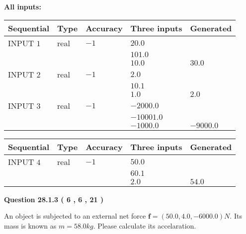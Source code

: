 \documentclass[12pt]{article}
\begin{document}
   
   
   
\noindent\vspace{0.1in}\hspace{-0.08in} {\textbf{\Large{All inputs: }}}
   
   
  
  
\noindent\begin{tabular}{|l|l|l|l|l|}
\hline
 Sequential & Type & Accuracy & Three inputs & Generated \\ 
\hline
 
 
  INPUT $            1 $ & real & $           -1  $ & $
 20.0
  $ & \\
  & & &  $
 101.0
  $ & \\
  & & &  $
 10.0
 $ & $ 30.0 $ 
 \\  \hline  
 
 
  INPUT $            2 $ & real & $           -1  $ & $
 2.0
  $ & \\
  & & &  $
 10.1
  $ & \\
  & & &  $
 1.0
 $ & $ 2.0 $ 
 \\  \hline  
 
 
  INPUT $            3 $ & real & $           -1  $ & $
 -2000.0
  $ & \\
  & & &  $
 -10001.0
  $ & \\
  & & &  $
 -1000.0
 $ & $ -9000.0 $ 
 \\  \hline  
 \end{tabular}
   
   
  
  
\noindent\begin{tabular}{|l|l|l|l|l|}
\hline
 Sequential & Type & Accuracy & Three inputs & Generated \\ 
\hline
 
 
  INPUT $            4 $ & real & $           -1  $ & $
 50.0
  $ & \\
  & & &  $
 60.1
  $ & \\
  & & &  $
 2.0
 $ & $ 54.0 $ 
 \\  \hline  
 \end{tabular}
   
   
  
\vspace{0.2in}
  
{\textbf{\Large{Question
28.1.3 
 (           6 ,           6 ,          21 )
}}}
  
  
 
An object is subjected to an external net force $\mathbf{f}=(
50.0,  %
4.0,
-6000.0  )N$. Its mass is known as
$m= %
58.0 kg$. Please calculate its accelaration.
 
\end{document}
